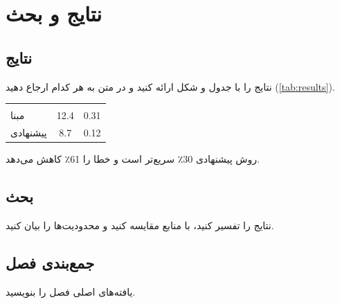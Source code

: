 \chapter{نتایج و بحث}\label{ch:results}

\section{نتایج}
نتایج را با جدول و شکل ارائه کنید و در متن به هر کدام ارجاع دهید (\cref{tab:results}).
\begin{center}\atlrows
  \label{tab:results}
  \begin{tabular}{@{}lS[table-format=2.1]S[table-format=1.2]@{}}
     & {} & {}\\
    مبنا & 12.4 & 0.31 \\
    پیشنهادی & 8.7 & 0.12 \\
  \end{tabular}
\end{center}

\begin{resultbox}
روش پیشنهادی \num{30}٪ سریع‌تر است و خطا را \num{61}٪ کاهش می‌دهد.
\end{resultbox}

\section{بحث}
نتایج را تفسیر کنید، با منابع مقایسه کنید و محدودیت‌ها را بیان کنید.

\section{جمع‌بندی فصل}
یافته‌های اصلی فصل را بنویسید.
